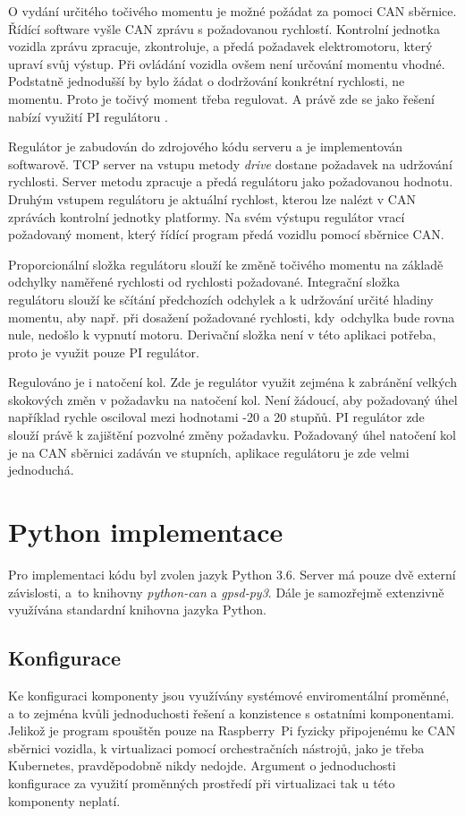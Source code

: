 \documentclass[czech, bachelor]{diploma}
\begin{document}
O vydání určitého točivého momentu je možné požádat za pomoci CAN sběrnice. Řídící software vyšle CAN zprávu s požadovanou
rychlostí. Kontrolní jednotka vozidla zprávu zpracuje, zkontroluje, a předá požadavek elektromotoru, který upraví svůj výstup.
Při ovládání vozidla ovšem není určování momentu vhodné. Podstatně jednodušší by bylo žádat o dodržování konkrétní rychlosti,
ne momentu. Proto je točivý moment třeba regulovat. A právě zde se jako řešení nabízí využití PI regulátoru
\cite{pid-controller-source}.

Regulátor je zabudován do zdrojového kódu serveru a je implementován softwarově. TCP server na vstupu metody \emph{drive} dostane
požadavek na udržování rychlosti. Server metodu zpracuje a předá regulátoru jako požadovanou hodnotu. Druhým vstupem regulátoru
je aktuální rychlost, kterou lze nalézt v CAN zprávách kontrolní jednotky platformy. Na svém výstupu regulátor vrací požadovaný
moment, který řídící program předá vozidlu pomocí sběrnice CAN.

Proporcionální složka regulátoru slouží ke změně točivého momentu na základě odchylky naměřené rychlosti od rychlosti požadované.
Integrační složka regulátoru slouží ke sčítání předchozích odchylek a k udržování určité hladiny momentu, aby např. při dosažení
požadované rychlosti, kdy~odchylka bude rovna nule, nedošlo k vypnutí motoru. Derivační složka není v této aplikaci potřeba, proto
je využit pouze PI regulátor.

Regulováno je i natočení kol. Zde je regulátor využit zejména k zabránění velkých skokových změn v požadavku na natočení kol. Není
žádoucí, aby požadovaný úhel například rychle osciloval mezi hodnotami -20 a 20 stupňů. PI regulátor zde slouží právě k zajištění
pozvolné změny požadavku. Požadovaný úhel natočení kol je na CAN sběrnici zadáván ve stupních, aplikace regulátoru je zde velmi
jednoduchá.

\section{Python implementace}

Pro implementaci kódu byl zvolen jazyk Python 3.6. Server má pouze dvě externí závislosti, a~to knihovny \emph{python-can} a
\emph{gpsd-py3}. Dále je samozřejmě extenzivně využívána standardní knihovna jazyka Python.

\subsection{Konfigurace}
Ke konfiguraci komponenty jsou využívány systémové enviromentální proměnné, a to zejména kvůli jednoduchosti řešení a konzistence
s ostatními komponentami. Jelikož je program spouštěn pouze na Raspberry~Pi fyzicky připojenému ke CAN sběrnici vozidla,
k virtualizaci pomocí orchestračních nástrojů, jako je třeba Kubernetes, pravděpodobně nikdy nedojde. Argument o jednoduchosti
konfigurace za využití proměnných prostředí při virtualizaci tak u této komponenty neplatí.
\end{document}
